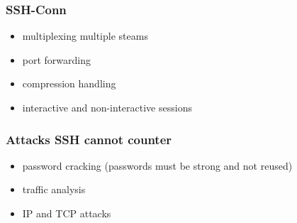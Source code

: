 \documentclass[english, leagacyboxes, nologo]{latex4ei/latex4ei_sheet}
\begin{document}
{    \subsubsection{SSH-Conn}
      \begin{itemize}
        \item multiplexing multiple steams
        \item port forwarding
        \item compression handling
        \item interactive and non-interactive sessions
      \end{itemize}

    \subsubsection{Attacks SSH cannot counter}
      \begin{itemize}
        \item password cracking (passwords must be strong and not reused)
        \item traffic analysis
        \item IP and TCP attacks
      \end{itemize}
  }
\end{document}

